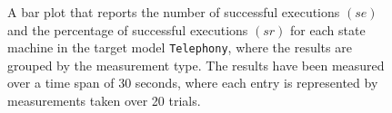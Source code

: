 \begin{figure}[h!]
\centering
\begin{minipage}{1\textwidth}
  \centering
  \makebox[\textwidth][c]{ %
        \resizebox{1.19\textwidth}{!}{ %
            
        }%
    }%
\end{minipage}
\caption{A bar plot that reports the number of successful executions $(se)$ and the percentage of successful executions $(sr)$ for each state machine in the target model \texttt{Telephony}, where the results are grouped by the measurement type. The results have been measured over a time span of 30 seconds, where each entry is represented by measurements taken over 20 trials.}
\label{figure:counting_logging_state_machine_transition_frequency_comparison_telephony_random_det}
\end{figure}